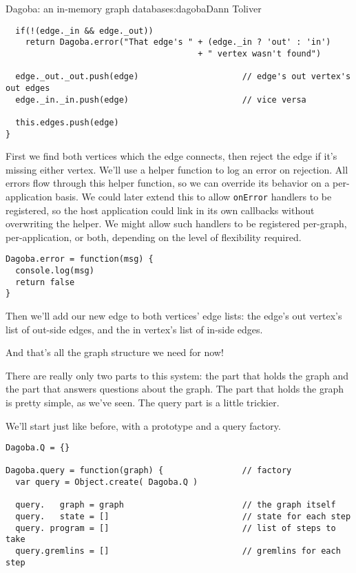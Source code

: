 \begin{aosachapter}{Dagoba: an in-memory graph database}{s:dagoba}{Dann Toliver}
\begin{verbatim}
  if(!(edge._in && edge._out))
    return Dagoba.error("That edge's " + (edge._in ? 'out' : 'in')
                                       + " vertex wasn't found")

  edge._out._out.push(edge)                     // edge's out vertex's out edges
  edge._in._in.push(edge)                       // vice versa

  this.edges.push(edge)
}
\end{verbatim}

First we find both vertices which the edge connects, then reject the
edge if it's missing either vertex. We'll use a helper function to log
an error on rejection. All errors flow through this helper function, so
we can override its behavior on a per-application basis. We could later
extend this to allow \texttt{onError} handlers to be registered, so the
host application could link in its own callbacks without overwriting the
helper. We might allow such handlers to be registered per-graph,
per-application, or both, depending on the level of flexibility
required.

\begin{verbatim}
Dagoba.error = function(msg) {
  console.log(msg)
  return false
}
\end{verbatim}

Then we'll add our new edge to both vertices' edge lists: the edge's out
vertex's list of out-side edges, and the in vertex's list of in-side
edges.

And that's all the graph structure we need for now!

\label{enter-the-query}

There are really only two parts to this system: the part that holds the
graph and the part that answers questions about the graph. The part that
holds the graph is pretty simple, as we've seen. The query part is a
little trickier.

We'll start just like before, with a prototype and a query factory.

\begin{verbatim}
Dagoba.Q = {}

Dagoba.query = function(graph) {                // factory
  var query = Object.create( Dagoba.Q )

  query.   graph = graph                        // the graph itself
  query.   state = []                           // state for each step
  query. program = []                           // list of steps to take
  query.gremlins = []                           // gremlins for each step


\end{verbatim}
\end{aosachapter}
